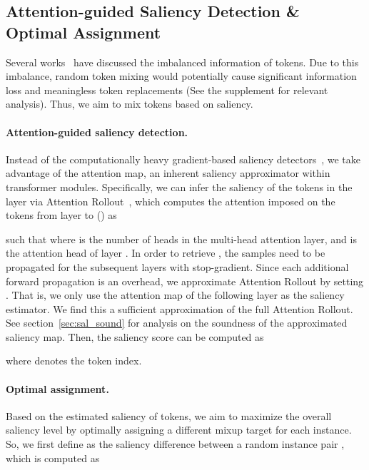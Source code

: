 \documentclass{article}
\begin{document}
%
 
\subsection{Attention-guided Saliency Detection \& Optimal Assignment}
Several works~\cite{heo2021rethinking, rao2021dynamicvit, roh2021sparse, wang2021pnp} have discussed the imbalanced information of tokens.
Due to this imbalance, random token mixing would potentially cause significant information loss and meaningless token replacements (See the supplement for relevant analysis).
Thus, we aim to mix tokens based on saliency.

\vspace{-2mm}
\paragraph{Attention-guided saliency detection.} 
Instead of the computationally heavy gradient-based saliency detectors~\cite{kim2020puzzle, kim2021co}, we take advantage of the attention map, an inherent saliency approximator within transformer modules.
Specifically, we can infer the saliency of the tokens in the  layer via Attention Rollout~\cite{abnar2020quantifying}, which computes the attention imposed on the tokens from layer  to  () as

such that  where  is the number of heads in the multi-head attention layer, and  is the  attention head of layer .
In order to retrieve , the samples need to be propagated for the subsequent  layers with stop-gradient.
Since each additional forward propagation is an overhead, we approximate Attention Rollout by setting .
That is, we only use the attention map of the following layer as the saliency estimator. 
We find this a sufficient approximation of the full Attention Rollout.
See section~\ref{sec:sal_sound} for analysis on the soundness of the approximated saliency map.
Then, the saliency score  can be computed as

where  denotes the token index.

\paragraph{Optimal assignment.} 
Based on the estimated saliency of tokens, we aim to maximize the overall saliency level by optimally assigning a different mixup target for each instance.
So, we first define  as the saliency difference between a random instance pair , which is computed as
\end{document}
